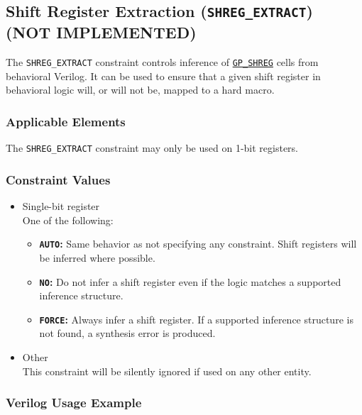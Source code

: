 \documentclass[11pt]{article}
\newcommand{\tokenstyle}[1]{\texttt{#1}}
\newcommand{\valuestyle}[1]{\texttt{#1}}
\newcommand{\strvaluestyle}[1]{\valuestyle{\textquotedbl#1\textquotedbl}}
\newcommand{\strexamplestyle}[1]{\textbf{\strvaluestyle{#1}:}}
\newcommand{\whenstyle}[1]{{\fontseries{sb}\selectfont#1}}
\newcommand{\tokenref}[2]{\hyperref[#2]{\tokenstyle{#1}}}
\begin{document}

\pagebreak
\subsection{Shift Register Extraction (\tokenstyle{SHREG\_EXTRACT}) (NOT IMPLEMENTED)}
\label{shreg-extract}

The \tokenstyle{SHREG\_EXTRACT} constraint controls inference of \tokenref{GP\_SHREG}{gp-shreg} cells from behavioral Verilog. It can be
used to ensure that a given shift register in behavioral logic will, or will not be, mapped to a hard macro.

\subsubsection{Applicable Elements}
The \tokenstyle{SHREG\_EXTRACT} constraint may only be used on 1-bit registers.

\subsubsection{Constraint Values}
\begin{itemize}
\item \whenstyle{Single-bit register}\\
One of the following:
\begin{itemize}
\item \strexamplestyle{AUTO} Same behavior as not specifying any constraint. Shift registers will be inferred where possible.
\item \strexamplestyle{NO} Do not infer a shift register even if the logic matches a supported inference structure.
\item \strexamplestyle{FORCE} Always infer a shift register. If a supported inference structure is not found, a synthesis error is produced.
\end{itemize}
\item \whenstyle{Other} \\
This constraint will be silently ignored if used on any other entity.
\end{itemize}

\subsubsection{Verilog Usage Example}
\end{document}
